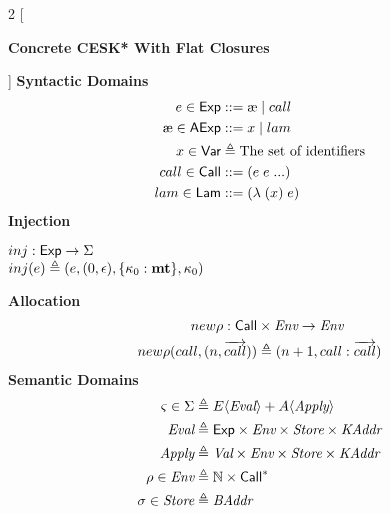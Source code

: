 \documentclass[12pt,draft]{article}
\newcommand\mae{\ensuremath{\text{\ae}}}
\begin{document}
\begin{multicols*}{2}
  [
  \begin{center}
    \textbf{Concrete CESK* With Flat Closures} \\
  \end{center}
  ]
  \noindent
  \textbf{Syntactic Domains}
  \begin{align*}
    e \in \cExp &::= \mae \;|\; call \\
    \mae \in \textsf{AExp} &::= x \;|\; lam \\
    x \in \cVar &\triangleq \text{The set of identifiers} \\
    call \in \cCall &::= (e \; e \; ...) \\
    lam \in \cLam &::= (\lambda \; (x) \; e) \\
  \end{align*}
  \textbf{Injection} \\
  \vspace{-7mm}
  \begin{center}
    $inj : \textsf{Exp} \rightarrow \Sigma$ \\
    $inj(e) \triangleq
    (e , (0 , \epsilon) , \{\kappa_0 : \textbf{mt} \} , \kappa_0)$
  \end{center}
  \textbf{Allocation} \\
  \vspace{-3mm}
  \begin{align*}
    new\rho : \textsf{Call} &\times \textit{Env} \rightarrow \textit{Env} \\
    new\rho(call , (n , \overrightarrow{call})) &\triangleq (n+1 , call : \overrightarrow{call})
  \end{align*}
  \vfill\null
  \columnbreak
  \noindent
  \textbf{Semantic Domains}
  \begin{align*}
    \cstate \in \cState &\triangleq E\langle \textit{Eval} \rangle
                          + A\langle \textit{Apply} \rangle \\
    \textit{Eval} &\triangleq \cExp \times \cEnv \times \cStore \times \cKAddr \\
    \textit{Apply} &\triangleq \cVal \times \cEnv \times \cStore \times \cKAddr \\
    \cenv \in \cEnv &\triangleq \mathbb{N} \times \cCall^* \\
    \cstore \in \cStore &\triangleq \cBAddr

\end{align*}
\end{multicols*}
\end{document}

